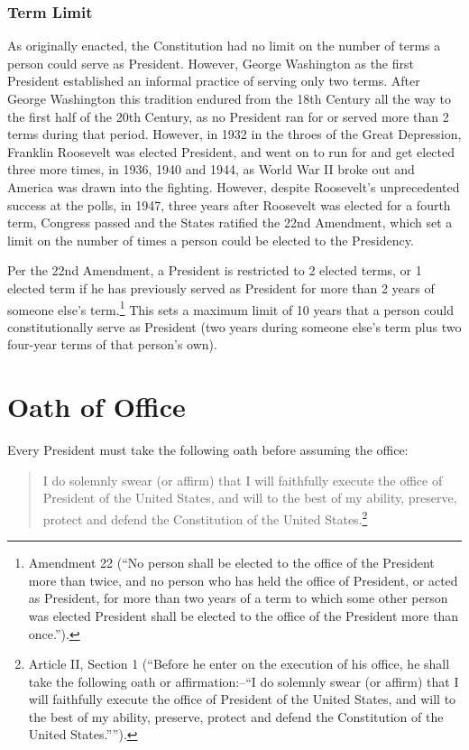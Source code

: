 \subsubsection{Term Limit}
As originally enacted, the Constitution had no limit on the number of terms a person could serve as President.  However, George Washington as the first President established an informal practice of serving only two terms.  After George Washington this tradition endured from the 18th Century all the way to the first half of the 20th Century, as no President ran for or served more than 2 terms during that period.  However, in 1932 in the throes of the Great Depression, Franklin Roosevelt was elected President, and went on to run for and get elected three more times, in 1936, 1940 and 1944, as World War II broke out and America was drawn into the fighting.  However, despite Roosevelt's unprecedented success at the polls, in 1947, three years after Roosevelt was elected for a fourth term, Congress passed and the States ratified the 22nd Amendment, which set a limit on the number of times a person could be elected to the Presidency.

Per the 22nd Amendment, a President is restricted to 2 elected terms, or 1 elected term if he has previously served as President for more than 2 years of someone else's term.\footnote{Amendment 22 (``No person shall be elected to the office of the President more than twice, and no person who has held the office of President, or acted as President, for more than two years of a term to which some other person was elected President shall be elected to the office of the President more than once.'').}  This sets a maximum limit of 10 years that a person could constitutionally serve as President (two years during someone else's term plus two four-year terms of that person's own).

\section{Oath of Office}
Every President must take the following oath before assuming the office:

\begin{quote}
I do solemnly swear (or affirm) that I will faithfully execute the office of President of the United States, and will to the best of my ability, preserve, protect and defend the Constitution of the United States.\footnote{Article II, Section 1 (``Before he enter on the execution of his office, he shall take the following oath or affirmation:--``I do solemnly swear (or affirm) that I will faithfully execute the office of President of the United States, and will to the best of my ability, preserve, protect and defend the Constitution of the United States.'''').}
\end{quote}

